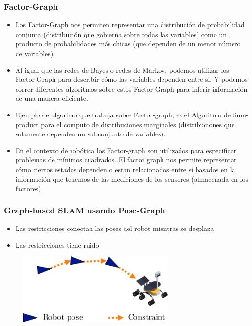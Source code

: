 \begin{frame}
    \frametitle{Factor-Graph}
    
    \begin{itemize}
        \item Los Factor-Graph nos permiten representar una distribución de probabilidad conjunta (distribución que gobierna sobre todas las variables) como un producto de probabilidades más chicas (que dependen de un menor número de variables).
        \item Al igual que las redes de Bayes o redes de Markov, podemos utilizar los Factor-Graph para describir cómo las variables dependen entre si. Y podemos correr diferentes algoritmos sobre estos Factor-Graph para inferir información de una manera eficiente.
        \item Ejemplo de algorimo que trabaja sobre Factor-graph, es el Algoritmo de Sum-product para el computo de distribuciones marginales (distribuciones que solamente dependen un subconjunto de variables).
        \item En el contexto de robótica los Factor-graph son utilizados para especificar problemas de mínimos cuadrados. El factor graph nos permite representar cómo ciertos estados dependen o estan relacionados entre sí basados en la información que tenemos de las mediciones de los sensores (almacenada en los factores).
    \end{itemize}
    
    
\end{frame}

\begin{frame}
    \frametitle{Graph-based SLAM usando Pose-Graph}
    
    \begin{itemize}
		\item Las restricciones conectan las poses del robot mientras se desplaza
		\item Las restricciones tiene ruido
    \end{itemize}

	\begin{figure}[!h]
		\includegraphics[width=0.7\textwidth]{images/pose_graph_example.pdf}
	\end{figure}
    
\end{frame}

